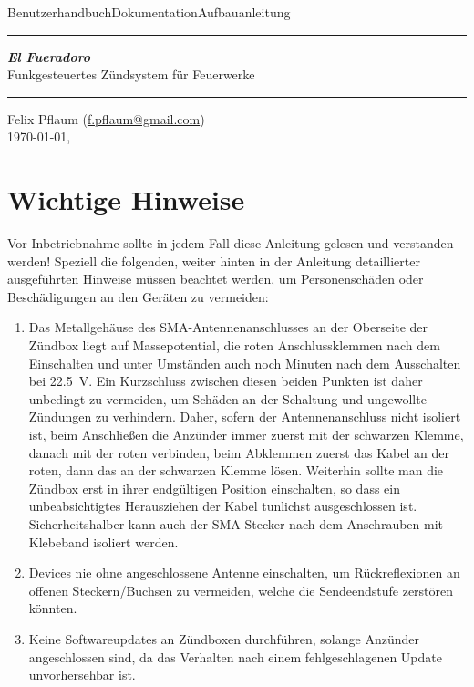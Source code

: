 \documentclass[paper=a4, parskip, numbers=noenddot, toc=listof, headsepline]{scrbook}
\newcommand{\anlage}{\emph{El Fueradoro}}
\begin{document}
	\begin{titlepage}
		\thispagestyle{empty}
		{\sffamily\LARGE Benutzerhandbuch{\hfill}Dokumentation{\hfill}Aufbauanleitung}\\ \hrule \vspace*{\fill}
		\begin{center}
			{\fontsize{90pt}{90pt} \sffamily\textbf{\anlage}} \\ \vspace{2em}
			{\LARGE \sffamily Funkgesteuertes Zündsystem für Feuerwerke}
		\end{center}
		\vspace*{\fill}
		\hrule
		\begin{center}
			\sffamily\Large Felix Pflaum (\href{mailto:f.pflaum@gmail.com}{f.pflaum@gmail.com})\\
			\normalsize \ddmmyyyydate\today, \currenttime
		\end{center}
	\end{titlepage}
	\chapter*{Wichtige Hinweise}

		Vor Inbetriebnahme sollte in jedem Fall diese Anleitung gelesen und verstanden werden! Speziell die folgenden, weiter hinten in der Anleitung detaillierter ausgeführten Hinweise müssen beachtet werden, um Personenschäden oder Beschädigungen an den Geräten zu vermeiden:

		{\bfseries
			\begin{enumerate}
				\item Das Metallgehäuse des SMA-Antennenanschlusses an der Oberseite der Zündbox liegt auf Massepotential, die roten Anschlussklemmen nach dem Einschalten und unter Umständen auch noch Minuten nach dem Ausschalten bei \SI{22,5}{\volt}. Ein Kurzschluss zwischen diesen beiden Punkten ist daher unbedingt zu vermeiden, um Schäden an der Schaltung und ungewollte Zündungen zu verhindern. Daher, sofern der Antennenanschluss nicht isoliert ist, beim Anschließen die Anzünder immer zuerst mit der schwarzen Klemme, danach mit der roten verbinden, beim Abklemmen zuerst das Kabel an der roten, dann das an der schwarzen Klemme lösen. Weiterhin sollte man die Zündbox erst in ihrer endgültigen Position einschalten, so dass ein unbeabsichtigtes Herausziehen der Kabel tunlichst ausgeschlossen ist. Sicherheitshalber kann auch der SMA-Stecker nach dem Anschrauben mit Klebeband isoliert werden.
				\item Devices nie ohne angeschlossene Antenne einschalten, um Rückreflexionen an offenen Steckern/Buchsen zu vermeiden, welche die Sendeendstufe zerstören könnten.
				\item Keine Softwareupdates an Zündboxen durchführen, solange Anzünder angeschlossen sind, da das Verhalten nach einem fehlgeschlagenen Update unvorhersehbar ist.
			\end{enumerate}
		}
\end{document}
